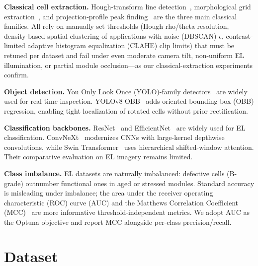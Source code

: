 \documentclass[conference]{IEEEtran}
\begin{document}
\textbf{Classical cell extraction.} Hough-transform line detection~\cite{duda1972}, morphological grid extraction~\cite{soille2003}, and projection-profile peak finding~\cite{wong1982} are the three main classical families. All rely on manually set thresholds (Hough rho/theta resolution, density-based spatial clustering of applications with noise (DBSCAN) $\epsilon$, contrast-limited adaptive histogram equalization (CLAHE) clip limits) that must be retuned per dataset and fail under even moderate camera tilt, non-uniform EL illumination, or partial module occlusion---as our classical-extraction experiments confirm.

\textbf{Object detection.} You Only Look Once (YOLO)-family detectors~\cite{redmon2016,jocher2023} are widely used for real-time inspection. YOLOv8-OBB~\cite{jocher2023} adds oriented bounding box (OBB) regression, enabling tight localization of rotated cells without prior rectification.

\textbf{Classification backbones.} ResNet~\cite{he2016} and EfficientNet~\cite{tan2019} are widely used for EL classification. ConvNeXt~\cite{liu2022} modernizes CNNs with large-kernel depthwise convolutions, while Swin Transformer~\cite{liu2021} uses hierarchical shifted-window attention. Their comparative evaluation on EL imagery remains limited.

\textbf{Class imbalance.} EL datasets are naturally imbalanced: defective cells (B-grade) outnumber functional ones in aged or stressed modules. Standard accuracy is misleading under imbalance; the area under the receiver operating characteristic (ROC) curve (AUC) and the Matthews Correlation Coefficient (MCC)~\cite{deitsch2019} are more informative threshold-independent metrics. We adopt AUC as the Optuna objective and report MCC alongside per-class precision/recall.

\section{Dataset}
\label{sec:dataset}
\end{document}
